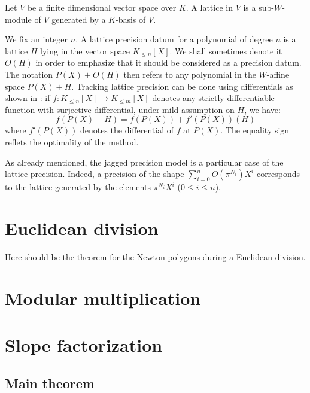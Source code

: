 \documentclass{sig-alternate-2013}
\begin{document}
\begin{deftn}
Let $V$ be a finite dimensional vector space over $K$. A lattice
in $V$ is a sub-$W$-module of $V$ generated by a $K$-basis of
$V$.
\end{deftn}

\noindent
We fix an integer $n$. A lattice precision datum for a polynomial of 
degree $n$ is a lattice $H$ lying in the vector space $K_{\leq n}[X]$. 
We shall sometimes denote it $O(H)$ in order to emphasize that it should 
be considered as a precision datum. The notation $P(X) + O(H)$ then 
refers to any polynomial in the $W$-affine space $P(X) + H$. Tracking
lattice precision can be done using differentials as shown in
\cite[Lemma~3.4 and Proposition~3.12]{padicprec}: if $f : K_{\leq n}[X] 
\to K_{\leq m}[X]$ denotes any strictly differentiable function with
surjective differential, under mild assumption on $H$, we have:
$$f(P(X)+H) = f(P(X)) + f'(P(X))(H)$$
where $f'(P(X))$ denotes the differential of $f$ at $P(X)$. The
equality sign reflets the optimality of the method.

As already mentioned, the jagged precision model is a particular case
of the lattice precision. Indeed, a precision of the shape
$\sum_{i=0}^n O(\pi^{N_i}) X^i$ corresponds to the lattice
generated by the elements $\pi^{N_i} X^i$ ($0 \leq i \leq n$).

\section{Euclidean division}

\begin{theo} \label{theo:EDivisionNP}
Here should be the theorem for the Newton polygons during a Euclidean division.
\end{theo}

\section{Modular multiplication}

\section{Slope factorization}
\subsection{Main theorem}
\end{document}
